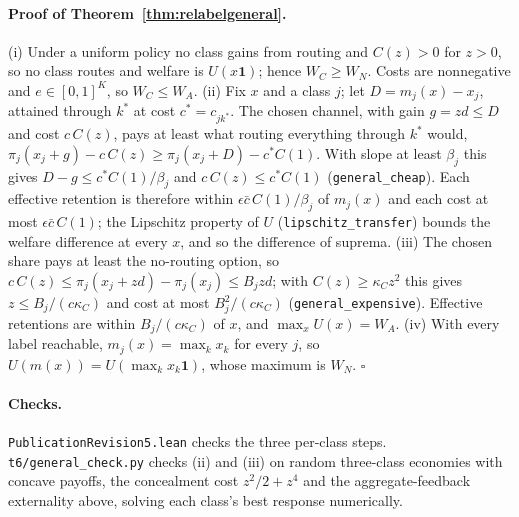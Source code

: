 \documentclass[12pt]{article}
\theoremstyle{definition}
\theoremstyle{remark}
\begin{document}
\paragraph{Proof of Theorem~\ref{thm:relabelgeneral}.} (i) Under a uniform policy no class gains from routing and $C(z)>0$ for $z>0$, so no class routes and welfare is $U(x\mathbf 1)$; hence $W_C\ge W_N$. Costs are nonnegative and $e\in[0,1]^K$, so $W_C\le W_A$. (ii) Fix $x$ and a class $j$; let $D=m_j(x)-x_j$, attained through $k^*$ at cost $c^*=c_{jk^*}$. The chosen channel, with gain $g=zd\le D$ and cost $c\,C(z)$, pays at least what routing everything through $k^*$ would, $\pi_j(x_j+g)-c\,C(z)\ge\pi_j(x_j+D)-c^*C(1)$. With slope at least $\beta_j$ this gives $D-g\le c^*C(1)/\beta_j$ and $c\,C(z)\le c^*C(1)$ (\nolinkurl{general_cheap}). Each effective retention is therefore within $\epsilon\bar c\,C(1)/\beta_j$ of $m_j(x)$ and each cost at most $\epsilon\bar c\,C(1)$; the Lipschitz property of $U$ (\nolinkurl{lipschitz_transfer}) bounds the welfare difference at every $x$, and so the difference of suprema. (iii) The chosen share pays at least the no-routing option, so $c\,C(z)\le\pi_j(x_j+zd)-\pi_j(x_j)\le B_jzd$; with $C(z)\ge\kappa_Cz^2$ this gives $z\le B_j/(c\kappa_C)$ and cost at most $B_j^2/(c\kappa_C)$ (\nolinkurl{general_expensive}). Effective retentions are within $B_j/(c\kappa_C)$ of $x$, and $\max_xU(x)=W_A$. (iv) With every label reachable, $m_j(x)=\max_kx_k$ for every $j$, so $U(m(x))=U(\max_kx_k\mathbf 1)$, whose maximum is $W_N$. $\square$

\paragraph{Checks.} \nolinkurl{PublicationRevision5.lean} checks the three per-class steps. \nolinkurl{t6/general_check.py} checks (ii) and (iii) on random three-class economies with concave payoffs, the concealment cost $z^2/2+z^4$ and the aggregate-feedback externality above, solving each class's best response numerically.
\end{document}
